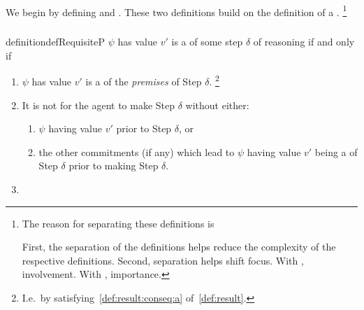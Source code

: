 \paragraph{}

\begin{note}
  We begin by defining  and .
  These two definitions build on the definition of a \result{}.\nolinebreak
  \footnote{
    The reason for separating these definitions is

    First, the separation of the definitions helps reduce the complexity of the respective definitions.
    Second, separation helps shift focus.
    With \result{}, involvement.
    With \requ{}, importance.
  }
\end{note}

\subparagraph*{}

\begin{note}
  \begin{restatable}{definition}{defRequisiteP}
    \label{def:prequ}
    \(\psi\) has value \(v'\) is a \emph{} of some step \(\delta\) of reasoning if and only if

    \begin{enumerate}[label=\arabic*., ref=\named{pR:\arabic*}]
    \item
      \(\psi\) has value \(v'\) is a  of the \emph{premises} of Step \(\delta\).\nolinebreak
      \footnote{
        I.e.\ by satisfying~\ref{def:result:conseq:a} of~\autoref{def:result}.
      }
    \item
      \label{def:prequ:subjunctive}
      It is not  for the agent to make Step \(\delta\) without either:
      \begin{enumerate}[label=\alph*., ref=\named{pR:2\alph*}]
      \item
        \label{def:prequ:subjunctive:psi}
        \(\psi\) having value \(v'\) prior to Step \(\delta\), or
      \item
        \label{def:prequ:subjunctive:other}
        the other commitments (if any) which lead to \(\psi\) having value \(v'\) being a  of Step \(\delta\) prior to making Step \(\delta\).
      \end{enumerate}
    \item
      \requGlobalClause{}
    \end{enumerate}
    \vspace{-\baselineskip}
  \end{restatable}
\end{note}

